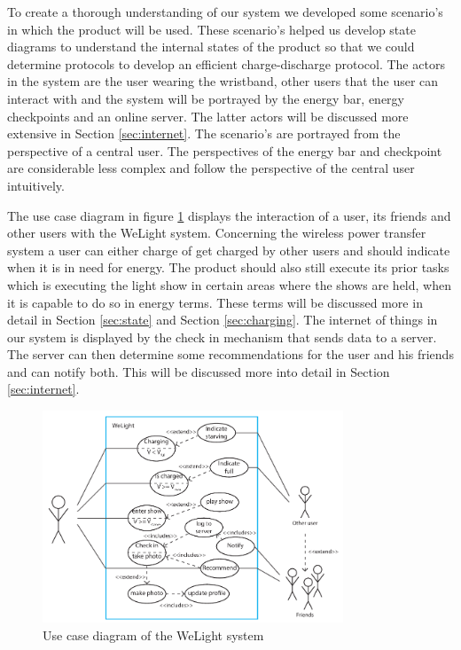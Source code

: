 %
To create a thorough understanding of our system we developed some scenario's in which the product will be used. These scenario's helped us develop state diagrams to understand the internal states of the product so that we could determine protocols to develop an efficient charge-discharge protocol. The actors in the system are the user wearing the wristband, other users that the user can interact with and the system will be portrayed by the energy bar, energy checkpoints and an online server. The latter actors will be discussed more extensive in Section \ref{sec:internet}. The scenario's are portrayed from the perspective of a central user. The perspectives of the energy bar and checkpoint are considerable less complex and follow the perspective of the central user intuitively. 

The use case diagram in figure \ref{fig:usecase} displays the interaction of a user, its friends and other users with the WeLight system. Concerning the wireless power transfer system a user can either charge of get charged by other users and should indicate when it is in need for energy. The product should also still execute its prior tasks which is executing the light show in certain areas where the shows are held, when it is capable to do so in energy terms. These terms will be discussed more in detail in Section \ref{sec:state} and Section \ref{sec:charging}. The internet of things in our system is displayed by the check in mechanism that sends data to a server. The server can then determine some recommendations for the user and his friends and can notify both. This will be discussed more into detail in Section \ref{sec:internet}.
%
\begin{figure}[h!]
\centering
\includegraphics[width=0.8\textwidth]{usecase.pdf}
\caption{Use case diagram of the WeLight system}
\label{fig:usecase}
\end{figure}

